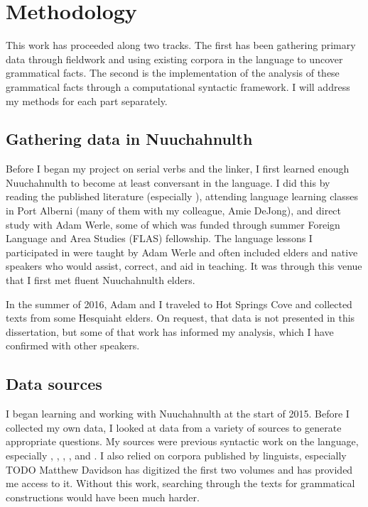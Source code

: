 \chapter{Methodology} \label{ch:methodology}

This work has proceeded along two tracks. The first has been gathering primary data through fieldwork and using existing corpora in the language to uncover grammatical facts. The second is the implementation of the analysis of these grammatical facts through a computational syntactic framework. I will address my methods for each part separately.

\section{Gathering data in Nuuchahnulth} \label{ch:method:ncn}

Before I began my project on serial verbs and the linker, I first learned enough Nuuchahnulth to become at least conversant in the language. I did this by reading the published literature (especially \citealt{sapir1939}), attending language learning classes in Port Alberni (many of them with my colleague, Amie DeJong), and direct study with Adam Werle, some of which was funded through summer Foreign Language and Area Studies (FLAS) fellowship. The language lessons I participated in were taught by Adam Werle and often included elders and native speakers who would assist, correct, and aid in teaching. It was through this venue that I first met fluent Nuuchahnulth elders.

In the summer of 2016, Adam and I traveled to Hot Springs Cove and collected texts from some Hesquiaht elders. On request, that data is not presented in this dissertation, but some of that work has informed my analysis, which I have confirmed with other speakers.

\section{Data sources} \label{ch:method:sources}

I began learning and working with Nuuchahnulth at the start of 2015. Before I collected my own data, I looked at data from a variety of sources to generate appropriate questions. My sources were previous syntactic work on the language, especially \citet{jacobsen1993}, \citet{nakayama2001}, \citet{wojdak2003}, \citet{waldie2004}, and \citet{woo2007b}. I also relied on corpora published by linguists, especially TODO Matthew Davidson has digitized the first two volumes \citep{sapir1939,sapir1955} and has provided me access to it. Without this work, searching through the texts for grammatical constructions would have been much harder.

